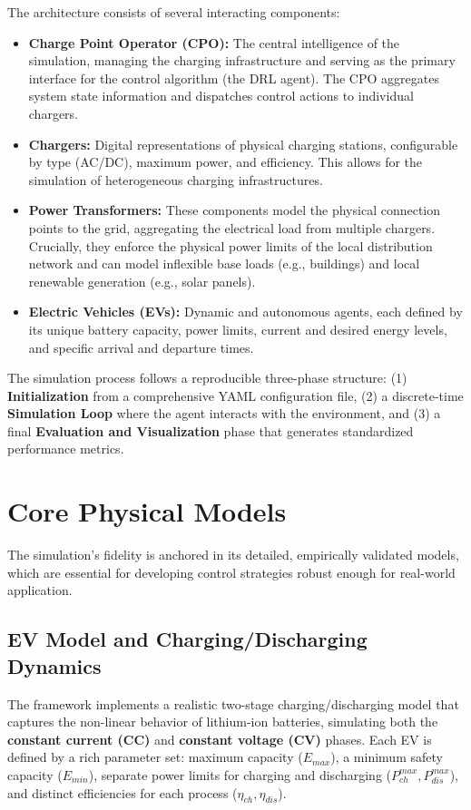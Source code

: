 The architecture consists of several interacting components:
\begin{itemize}
    \item \textbf{Charge Point Operator (CPO):} The central intelligence of the simulation, managing the charging infrastructure and serving as the primary interface for the control algorithm (the DRL agent). The CPO aggregates system state information and dispatches control actions to individual chargers.
    \item \textbf{Chargers:} Digital representations of physical charging stations, configurable by type (AC/DC), maximum power, and efficiency. This allows for the simulation of heterogeneous charging infrastructures.
    \item \textbf{Power Transformers:} These components model the physical connection points to the grid, aggregating the electrical load from multiple chargers. Crucially, they enforce the physical power limits of the local distribution network and can model inflexible base loads (e.g., buildings) and local renewable generation (e.g., solar panels).
    \item \textbf{Electric Vehicles (EVs):} Dynamic and autonomous agents, each defined by its unique battery capacity, power limits, current and desired energy levels, and specific arrival and departure times.
\end{itemize}

The simulation process follows a reproducible three-phase structure: (1) \textbf{Initialization} from a comprehensive YAML configuration file, (2) a discrete-time \textbf{Simulation Loop} where the agent interacts with the environment, and (3) a final \textbf{Evaluation and Visualization} phase that generates standardized performance metrics.

\section{Core Physical Models}
The simulation's fidelity is anchored in its detailed, empirically validated models, which are essential for developing control strategies robust enough for real-world application.

\subsection{EV Model and Charging/Discharging Dynamics}
The framework implements a realistic two-stage charging/discharging model that captures the non-linear behavior of lithium-ion batteries, simulating both the \textbf{constant current (CC)} and \textbf{constant voltage (CV)} phases. Each EV is defined by a rich parameter set: maximum capacity ($E_{max}$), a minimum safety capacity ($E_{min}$), separate power limits for charging and discharging ($P_{ch}^{max}, P_{dis}^{max}$), and distinct efficiencies for each process ($\eta_{ch}, \eta_{dis}$).

